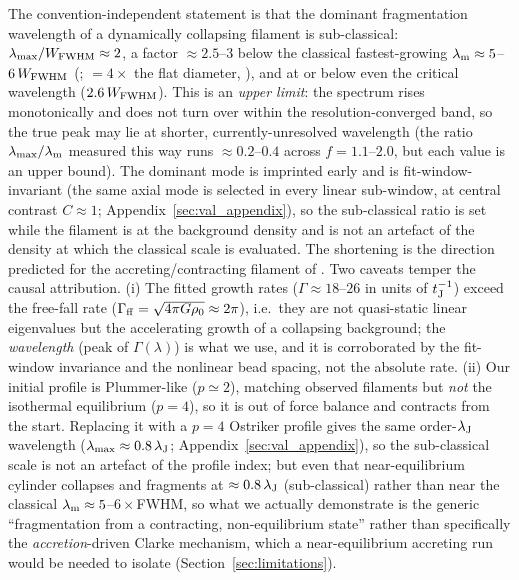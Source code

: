 \documentclass[usenatbib,twoside,twocolumn]{mnras}
\begin{document}
The convention-independent statement is that the dominant fragmentation wavelength of a dynamically collapsing filament is sub-classical: $\lambda_{\rm max}/W_{\rm FWHM}\approx2$, a factor $\approx2.5$--$3$ below the classical fastest-growing $\lambda_{\rm m}\approx5$--$6\,W_{\rm FWHM}$ (\citealt{Fischera2012}; $=4\times$ the flat diameter, \citealt{Inutsuka1992}), and at or below even the critical wavelength ($2.6\,W_{\rm FWHM}$). This is an \emph{upper limit}: the spectrum rises monotonically and does not turn over within the resolution-converged band, so the true peak may lie at shorter, currently-unresolved wavelength (the ratio $\lambda_{\rm max}/\lambda_{\rm m}$ measured this way runs $\approx0.2$--$0.4$ across $f=1.1$--$2.0$, but each value is an upper bound). The dominant mode is imprinted early and is fit-window-invariant (the same axial mode is selected in every linear sub-window, at central contrast $C\approx1$; Appendix~\ref{sec:val_appendix}), so the sub-classical ratio is set while the filament is at the background density and is not an artefact of the density at which the classical scale is evaluated. The shortening is the direction predicted for the accreting/contracting filament of \citet{Clarke2016,Clarke2017}. Two caveats temper the causal attribution. (i) The fitted growth rates ($\Gamma\approx18$--$26$ in units of $t_{\rm J}^{-1}$) exceed the free-fall rate ($\Gamma_{\rm ff}=\sqrt{4\pi G\rho_0}\approx2\pi$), i.e.\ they are not quasi-static linear eigenvalues but the accelerating growth of a collapsing background; the \emph{wavelength} (peak of $\Gamma(\lambda)$) is what we use, and it is corroborated by the fit-window invariance and the nonlinear bead spacing, not the absolute rate. (ii) Our initial profile is Plummer-like ($p\simeq2$), matching observed filaments but \emph{not} the isothermal equilibrium ($p=4$), so it is out of force balance and contracts from the start. Replacing it with a $p=4$ Ostriker profile gives the same order-$\lambda_{\rm J}$ wavelength ($\lambda_{\rm max}\approx0.8\,\lambda_{\rm J}$; Appendix~\ref{sec:val_appendix}), so the sub-classical scale is not an artefact of the profile index; but even that near-equilibrium cylinder collapses and fragments at $\approx0.8\,\lambda_{\rm J}$ (sub-classical) rather than near the classical $\lambda_{\rm m}\approx5$--$6\times$FWHM, so what we actually demonstrate is the generic ``fragmentation from a contracting, non-equilibrium state'' rather than specifically the \emph{accretion}-driven Clarke mechanism, which a near-equilibrium accreting run would be needed to isolate (Section~\ref{sec:limitations}).
\end{document}
